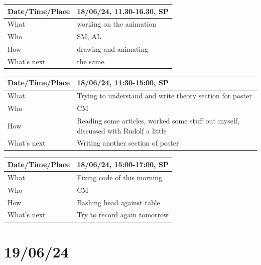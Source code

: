 \documentclass{article}
\begin{document}
\begin{table}[H]
\begin{tabular}{|p{1.5in}|p{4in}|}
\hline
Date/Time/Place & 18/06/24, 11.30-16.30, SP\\ \hline
What            &  working on the animation\\ \hline
Who             &  SM, AL\\ \hline
How             &  drawing and animating\\ \hline
What's next     &  the same\\ \hline
\end{tabular}
\end{table}

\begin{table}[H]
\begin{tabular}{|p{1.5in}|p{4in}|}
\hline
Date/Time/Place &  18/06/24, 11:30-15:00, SP\\ \hline
What            &  Trying to understand and write theory section for poster\\ \hline
Who             &  CM\\ \hline
How             &  Reading some articles, worked some stuff out myself, discussed with Rudolf a little\\ \hline
What's next     &  Writing another section of poster\\ \hline
\end{tabular}
\end{table}

\begin{table}[H]
\begin{tabular}{|p{1.5in}|p{4in}|}
\hline
Date/Time/Place &  18/06/24, 15:00-17:00, SP\\ \hline
What            &  Fixing code of this morning\\ \hline
Who             &  CM\\ \hline
How             &  Bashing head against table\\ \hline
What's next     &  Try to record again tomorrow\\ \hline
\end{tabular}
\end{table}

\section{19/06/24}
\end{document}
